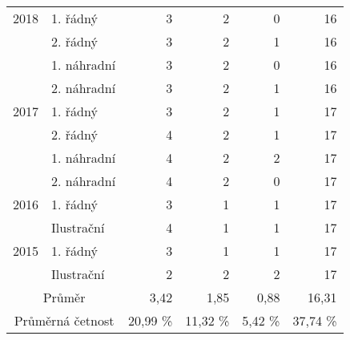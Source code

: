 \begin{table}[p]
\begin{center}
\begin{tabular}{|l|l|r|r|r|r|}
            \multicolumn{ 1}{|c|}{2018} & 1. řádný    & 3 & 2 & 0 & 16 \\ \cline{ 2- 6}
            \multicolumn{ 1}{|l|}{}     & 2. řádný    & 3 & 2 & 1 & 16 \\ \cline{ 2- 6}
            \multicolumn{ 1}{|l|}{}     & 1. náhradní & 3 & 2 & 0 & 16 \\ \cline{ 2- 6}
            \multicolumn{ 1}{|l|}{}     & 2. náhradní & 3 & 2 & 1 & 16 \\ \hline
            \multicolumn{ 1}{|c|}{2017} & 1. řádný    & 3 & 2 & 1 & 17 \\ \cline{ 2- 6}
            \multicolumn{ 1}{|l|}{}     & 2. řádný    & 4 & 2 & 1 & 17 \\ \cline{ 2- 6}
            \multicolumn{ 1}{|l|}{}     & 1. náhradní & 4 & 2 & 2 & 17 \\ \cline{ 2- 6}
            \multicolumn{ 1}{|l|}{}     & 2. náhradní & 4 & 2 & 0 & 17 \\ \hline
            \multicolumn{ 1}{|c|}{2016} & 1. řádný    & 3 & 1 & 1 & 17 \\ \cline{ 2- 6}
            \multicolumn{ 1}{|l|}{}     & Ilustrační  & 4 & 1 & 1 & 17 \\ \hline
            \multicolumn{ 1}{|c|}{2015} & 1. řádný    & 3 & 1 & 1 & 17 \\ \cline{ 2- 6}
            \multicolumn{ 1}{|l|}{}     & Ilustrační  & 2 & 2 & 2 & 17 \\ \hline
            \multicolumn{ 2}{|c|}{Průměr} & 3,42 & 1,85 & 0,88 & 16,31 \\ \hline
            \multicolumn{ 2}{|c|}{Průměrná četnost} & 20,99 \% & 11,32 \% & 5,42 \% & 37,74 \% \\ \hline
        \end{tabular}
    \end{center}
    \label{tab:6ulo}
\end{table}

